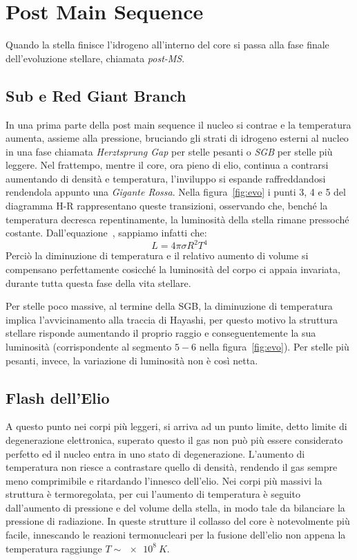 \section{Post Main Sequence}\label{sec:post-main-sequence}
Quando la stella finisce l'idrogeno all'interno del core si passa alla fase finale dell'evoluzione stellare, chiamata \textit{post-MS}. 

\subsection{Sub e Red Giant Branch}\label{sec:SGB-RGB}
In una prima parte della post main sequence il nucleo si contrae e la temperatura aumenta, assieme alla pressione, bruciando gli strati di idrogeno esterni al nucleo in una fase chiamata \textit{Herztsprung Gap} per stelle pesanti o \textit{SGB} per stelle più leggere. Nel frattempo, mentre il core, ora pieno di elio, continua a contrarsi aumentando di densità e temperatura, l'inviluppo si espande raffreddandosi rendendola appunto una \textit{Gigante Rossa}. Nella figura~\ref{fig:evo} i punti 3, 4 e 5 del diagramma H-R rappresentano queste transizioni, osservando che, benché la temperatura decresca repentinamente, la luminosità della stella rimane pressoché costante. Dall'equazione~, sappiamo infatti che:
\[
    L = 4\pi \sigma R^2 T^4
\]
Perciò la diminuzione di temperatura e il relativo aumento di volume si compensano perfettamente cosicché la luminosità del corpo ci appaia invariata, durante tutta questa fase della vita stellare.

Per stelle poco massive, al termine della SGB, la diminuzione di temperatura implica l'avvicinamento alla traccia di Hayashi, per questo motivo la struttura stellare risponde aumentando il proprio raggio e conseguentemente la sua luminosità (corrispondente al segmento $5-6$ nella figura~\ref{fig:evo}). Per stelle più pesanti, invece, la variazione di luminosità non è così netta. 
\subsection{Flash dell'Elio}\label{sec:flash-He e Horizontal Branch}

A questo punto nei corpi più leggeri, si arriva ad un punto limite, detto limite di degenerazione elettronica, superato questo il gas non può più essere considerato perfetto ed il nucleo entra in uno stato di degenerazione. L'aumento di temperatura non riesce a contrastare quello di densità, rendendo il gas sempre meno comprimibile e ritardando l'innesco dell'elio. Nei corpi più massivi la struttura è termoregolata, per cui l'aumento di temperatura è seguito dall'aumento di pressione e del volume della stella, in modo tale da bilanciare la pressione di radiazione. In queste strutture il collasso del core è notevolmente più facile, innescando le reazioni termonucleari per la fusione dell'elio non appena la temperatura raggiunge $T \sim \SI{e8}{K}$.


